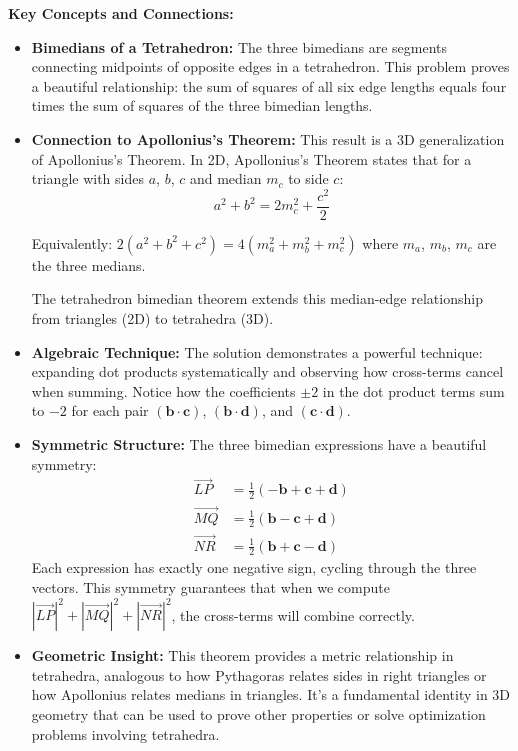 \begin{takeaways}
\textbf{Key Concepts and Connections:}

\begin{itemize}
    \item \textbf{Bimedians of a Tetrahedron:} The three bimedians are segments connecting midpoints of opposite edges in a tetrahedron. This problem proves a beautiful relationship: the sum of squares of all six edge lengths equals four times the sum of squares of the three bimedian lengths.
    
    \item \textbf{Connection to Apollonius's Theorem:} This result is a 3D generalization of Apollonius's Theorem. In 2D, Apollonius's Theorem states that for a triangle with sides $a$, $b$, $c$ and median $m_c$ to side $c$:
    $$a^2 + b^2 = 2m_c^2 + \frac{c^2}{2}$$
    
    Equivalently: $2(a^2 + b^2 + c^2) = 4(m_a^2 + m_b^2 + m_c^2)$ where $m_a$, $m_b$, $m_c$ are the three medians.
    
    The tetrahedron bimedian theorem extends this median-edge relationship from triangles (2D) to tetrahedra (3D).
    
    \item \textbf{Algebraic Technique:} The solution demonstrates a powerful technique: expanding dot products systematically and observing how cross-terms cancel when summing. Notice how the coefficients $\pm 2$ in the dot product terms sum to $-2$ for each pair $(\mathbf{b}\cdot\mathbf{c})$, $(\mathbf{b}\cdot\mathbf{d})$, and $(\mathbf{c}\cdot\mathbf{d})$.
    
    \item \textbf{Symmetric Structure:} The three bimedian expressions have a beautiful symmetry:
    \begin{align*}
    \overrightarrow{LP} &= \frac{1}{2}(-\mathbf{b} + \mathbf{c} + \mathbf{d}) \\
    \overrightarrow{MQ} &= \frac{1}{2}(\mathbf{b} - \mathbf{c} + \mathbf{d}) \\
    \overrightarrow{NR} &= \frac{1}{2}(\mathbf{b} + \mathbf{c} - \mathbf{d})
    \end{align*}
    Each expression has exactly one negative sign, cycling through the three vectors. This symmetry guarantees that when we compute $|\overrightarrow{LP}|^2 + |\overrightarrow{MQ}|^2 + |\overrightarrow{NR}|^2$, the cross-terms will combine correctly.
    
    \item \textbf{Geometric Insight:} This theorem provides a metric relationship in tetrahedra, analogous to how Pythagoras relates sides in right triangles or how Apollonius relates medians in triangles. It's a fundamental identity in 3D geometry that can be used to prove other properties or solve optimization problems involving tetrahedra.
\end{itemize}
\end{takeaways}

